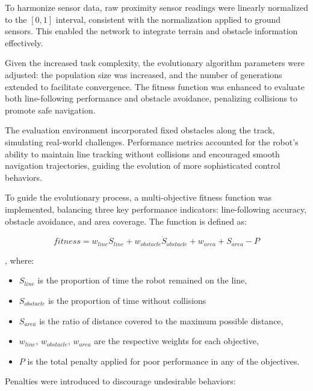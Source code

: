 \documentclass[final,5p,times,twocolumn,authoryear]{elsarticle}
\begin{document}
To harmonize sensor data, raw proximity sensor readings were linearly normalized to the \([0,1]\) interval, consistent with the normalization applied to ground sensors. This enabled the network to integrate terrain and obstacle information effectively.

Given the increased task complexity, the evolutionary algorithm parameters were adjusted: the population size was increased, and the number of generations extended to facilitate convergence. The fitness function was enhanced to evaluate both line-following performance and obstacle avoidance, penalizing collisions to promote safe navigation.

The evaluation environment incorporated fixed obstacles along the track, simulating real-world challenges. Performance metrics accounted for the robot’s ability to maintain line tracking without collisions and encouraged smooth navigation trajectories, guiding the evolution of more sophisticated control behaviors.

To guide the evolutionary process, a multi-objective fitness function was implemented, balancing three key performance indicators: line-following accuracy, obstacle avoidance, and area coverage. The function is defined as:

\begin{equation}
    fitness= w_{line} \dot S_{line} + w_{obstacle} \dot S_{obstacle} + w_{area} + S_{area} - P
\end{equation}

, where:

\begin{itemize}
    \item $S_{line}$ is the proportion of time the robot remained on the line,

    \item $S_{obstacle}$ is the proportion of time without collisions

    \item $S_{area}$ is the ratio of distance covered to the maximum possible distance,

    \item  $ w_{line}$, $w_{obstacle}$, $w_{area}$ are the respective weights for each objective,

    \item $P$ is the total penalty applied for poor performance in any of the objectives.
\end{itemize}

Penalties were introduced to discourage undesirable behaviors:
\end{document}

